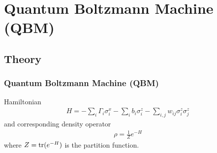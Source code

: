 \documentclass{beamer}
\begin{document}




\section{Quantum Boltzmann Machine (QBM)}

\subsection{Theory}
\begin{frame}
    \frametitle{Quantum Boltzmann Machine (QBM)}
    Hamiltonian~\cite{amin_2018}
    \begin{align}
        H = -\sum_i \Gamma_i \sigma_i^x -\sum_i b_i \sigma_i^z - \sum_{i,j} w_{ij} \sigma_i^z \sigma_j^z
    \end{align}
    and corresponding density operator
    \begin{align}
        \rho = \frac{1}{Z} e^{-H}
    \end{align}
    where \( Z = \text{tr}(e^{-H}) \) is the partition function.
\end{frame}
\end{document}
